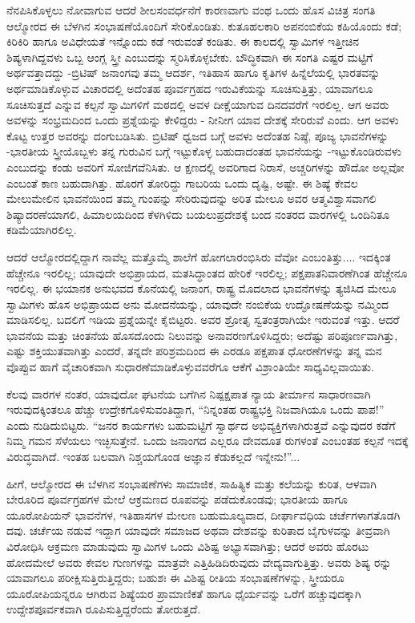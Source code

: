 ನೆನಪಿಸಿಕೊಳ್ಳಲು ನೋವಾಗುವ ಆದರೆ ಶೀಲಸಂವರ್ಧನೆಗೆ ಕಾರಣವಾಗು ವಂಥ ಒಂದು ಹೊಸ ವಿಚಿತ್ರ ಸಂಗತಿ ಆಲ್ಮೋರದ ಈ ಬೆಳಗಿನ ಸಂಭಾಷಣೆಯೊಂದಿಗೆ ಸೇರಿಕೊಂಡಿತು. ಕುತೂಹಲಕಾರಿ ಅಪನಂಬಿಕೆಯ ಕಹಿಯೊಂದು ಕಡೆ; ಕಿರಿಕಿರಿ ಹಾಗೂ ಅವಿಧೇಯತೆ ಇನ್ನೊಂದು ಕಡೆ ಇರುವಂತೆ ಕಂಡಿತು. ಈ ಕಾಲದಲ್ಲಿ ಸ್ವಾಮಿಗಳ ಇತ್ತೀಚಿನ ಶಿಷ್ಯಳಾಗಿದ್ದವಳು ಒಬ್ಬ ಆಂಗ್ಲ ಸ್ತ್ರೀ ಎಂಬುದನ್ನು ಸ್ಮರಿಸಿಕೊಳ್ಳಬೇಕು. ಬೌದ್ಧಿಕವಾಗಿ ಈ ಸಂಗತಿ ಎಷ್ಟರ ಮಟ್ಟಿಗೆ ಅರ್ಥವತ್ತಾದದ್ದು -ಬ್ರಿಟಿಷ್ ಜನಾಂಗವು ತಮ್ಮ ಆದರ್ಶ, ಇತಿಹಾಸ ಹಾಗೂ ಕೃತಿಗಳ ಹಿನ್ನೆಲೆಯಲ್ಲಿ ಭಾರತವನ್ನು ಅರ್ಥಮಾಡಿಕೊಳ್ಳುವ ವಿಚಾರದಲ್ಲಿ ಅದೆಂತಹ ಪೂರ್ವಗ್ರಹದ ಇರುವಿಕೆಯನ್ನು ಸೂಚಿಸುತ್ತಿತ್ತು, ಯಾವಾಗಲೂ ಸೂಚಿಸುತ್ತದೆ ಎನ್ನುವ ಕಲ್ಪನೆ ಸ್ವಾಮಿಗಳಿಗೆ ಮಠದಲ್ಲಿ ಅವಳ ದೀಕ್ಷೆಯಾಗುವ ದಿನದವರೆಗೆ ಇರಲಿಲ್ಲ. ಆಗ ಅವರು ಅವಳನ್ನು ಸಂಭ್ರಮದಿಂದ ಒಂದು ಪ್ರಶ್ನೆಯನ್ನು ಕೇಳಿದ್ದರು - ನೀನೀಗ ಯಾವ ದೇಶಕ್ಕೆ ಸೇರಿರುವೆ ಎಂದು. ಆಗ ಅವಳು ಕೊಟ್ಟ ಉತ್ತರ ಅವರನ್ನು ದಂಗುಬಡಿಸಿತು. ಬ್ರಿಟಿಷ್ ಧ್ವಜದ ಬಗ್ಗೆ ಅವಳು ಅದೆಂತಹ ನಿಷ್ಠೆ, ಪೂಜ್ಯ ಭಾವನೆಗಳನ್ನು -ಭಾರತೀಯ ಸ್ತ್ರೀಯೊಬ್ಬಳು ತನ್ನ ಗುರುವಿನ ಬಗ್ಗೆ ಇಟ್ಟುಕೊಳ್ಳ ಬಹುದಾದಂತಹ ಭಾವನೆಯನ್ನು -ಇಟ್ಟುಕೊಂಡಿರುವಳು ಎಂಬುದನ್ನು ಕಂಡು ಅವರಿಗೆ ಸೋಜಿಗವೆನಿಸಿತು. ಆ ಕ್ಷಣದಲ್ಲಿ ಅವರಿಗಾದ ನಿರಾಸೆ, ಅಚ್ಚರಿಗಳನ್ನು ಹೌದೋ ಅಲ್ಲವೋ ಎಂಬಂತೆ ಕಾಣ ಬಹುದಾಗಿತ್ತು. ಹೊರಗೆ ತೋರಿದ್ದು ಗಾಬರಿಯ ಒಂದು ದೃಷ್ಟಿ, ಅಷ್ಟೇ. ಈ ಶಿಷ್ಯೆ ಕೇವಲ ಮೇಲುಮೇಲಿನ ಭಾವನೆಯಿಂದ ತಮ್ಮ ಗುಂಪನ್ನು ಸೇರಿರುವುದನ್ನು ಅರಿತ ಮೇಲೂ ಅವರ ಆತ್ಮವಿಶ್ವಾಸವಾಗಲಿ ಶಿಷ್ಯಾದರಣೆಯಾಗಲಿ, ಹಿಮಾಲಯದಿಂದ ಕೆಳಗಿಳಿದು ಬಯಲುಪ್ರದೇಶಕ್ಕೆ ಬಂದ ನಂತರದ ವಾರಗಳಲ್ಲಿ ಒಂದಿನಿತೂ ಕಡಿಮೆಯಾಗಿರಲಿಲ್ಲ.

ಆದರೆ ಆಲ್ಮೋರದಲ್ಲಿದ್ದಾಗ ನಾವೆಲ್ಲ ಮತ್ತೊಮ್ಮೆ ಶಾಲೆಗೆ ಹೋಗಲಾರಂಭಿಸಿರು ವೆವೋ ಎಂಬಂತಿತ್ತು.... ಇದಕ್ಕಿಂತ ಹೆಚ್ಚೇನೂ ಇರಲಿಲ್ಲ; ಯಾವುದೇ ಅಭಿಪ್ರಾಯದ, ಮತಸಿದ್ಧಾಂತದ ಹೇರಿಕೆ ಇರಲಿಲ್ಲ; ಪಕ್ಷಪಾತನಿವಾರಣೆಗಿಂತ ಹೆಚ್ಚೇನೂ ಇರಲಿಲ್ಲ. ಈ ಭಯಾನಕ ಅನುಭವದ ಕೊನೆಯಲ್ಲಿ ಜನಾಂಗ, ರಾಷ್ಟ್ರ ಮೊದಲಾದ ಭಾವನೆಗಳನ್ನು ತ್ಯಜಿಸಿದ ಮೇಲೂ ಸ್ವಾಮಿಗಳು ಹೊಸ ಅಭಿಪ್ರಾಯದ ಅನು ಮೋದನೆಯನ್ನು, ಯಾವುದೇ ನಂಬಿಕೆಯ ಉದ್ಘೋಷಣೆಯನ್ನು ನಮ್ಮಿಂದ ಮಾಡಿಸಲಿಲ್ಲ. ಬದಲಿಗೆ ಇಡಿಯ ಪ್ರಶ್ನೆಯನ್ನೇ ಕೈಬಿಟ್ಟರು. ಅವರ ಶ್ರೋತೃ ಸ್ವತಂತ್ರರಾಗಿಯೇ ಇರುವಂತೆ ಇತ್ತು. ಆದರೆ ಭಾವನೆಯ ಮತ್ತು ಚಿಂತನೆಯ ಹೊಸದೊಂದು ನಿಲುವನ್ನು ಅನಾವರಣಗೊಳಿಸಿದ್ದರು; ಅದೆಷ್ಟು ಪರಿಪೂರ್ಣವಾಗಿತ್ತು, ಎಷ್ಟು ಶಕ್ತಿಯುತವಾಗಿತ್ತು ಎಂದರೆ, ತನ್ನದೇ ಪರಿಶ್ರಮದಿಂದ ಈ ಎರಡೂ ಪಕ್ಷಪಾತ ಧೋರಣೆಗಳನ್ನು ತನ್ನ ಮನ ವೊಪ್ಪುವ ಹಾಗೆ ವೈಚಾರಿಕವಾಗಿ ಸುಧಾರಣೆಮಾಡಿಕೊಳ್ಳುವವರೆಗೂ ಆಕೆಗೆ ವಿಶ್ರಾಂತಿಯೇ ಸಾಧ್ಯವಿಲ್ಲವಾಯಿತು.

ಕೆಲವು ವಾರಗಳ ನಂತರ, ಯಾವುದೋ ಘಟನೆಯ ಬಗೆಗಿನ ನಿಷ್ಪಕ್ಷಪಾತ ನ್ಯಾಯ ತೀರ್ಮಾನ ಸಾಧಾರಣವಾಗಿ ಇರುವುದಕ್ಕಿಂತಲೂ ಹೆಚ್ಚು ಉದ್ರೇಕಗೊಳಿಸುವಂತಿದ್ದಾಗ, “ನಿನ್ನಂತಹ ರಾಷ್ಟ್ರಭಕ್ತಿ ನಿಜವಾಗಿಯೂ ಒಂದು ಪಾಪ!” ಎಂದು ನುಡಿದುಬಿಟ್ಟರು. “ಜನರ ಕಾರ್ಯಗಳು ಬಹುಮಟ್ಟಿಗೆ ಸ್ವಾರ್ಥದ ಅಭಿವ್ಯಕ್ತಿಗಳಾಗಿರುತ್ತವೆ ಎನ್ನುವುದರ ಕಡೆಗೆ ನಿಮ್ಮ ಗಮನ ಸೆಳೆಯಲು ಇಚ್ಛಿಸುತ್ತೇನೆ. ಒಂದು ಜನಾಂಗದ ಎಲ್ಲರೂ ದೇವದೂತ ರುಗಳಂತೆ ಎಂಬಂತಹ ಕಲ್ಪನೆ ಇದಕ್ಕೆ ವಿರುದ್ಧವಾಗಿದೆ. ಇಂತಹ ಬಲವಾಗಿ ನಿಶ್ಚಯಗೊಂಡ ಅಜ್ಞಾನ ಕೆಡುಕಲ್ಲದೆ ಇನ್ನೇನು!”...

ಹೀಗೆ, ಆಲ್ಮೋರದ ಈ ಬೆಳಗಿನ ಸಂಭಾಷಣೆಗಳು ಸಾಮಾಜಿಕ, ಸಾಹಿತ್ಯಿಕ ಮತ್ತು ಕಲೆಯನ್ನು ಕುರಿತ, ಆಳವಾಗಿ ಬೇರೂರಿದ ಪೂರ್ವಗ್ರಹಗಳ ಮೇಲೆ ಆಕ್ರಮಣದ ರೂಪವನ್ನು ಪಡೆದುಕೊಂಡವು; ಭಾರತೀಯ ಹಾಗೂ ಯೂರೋಪಿಯನ್ ಭಾವನೆಗಳ, ಇತಿಹಾಸಗಳ ಮೇಲಣ ಬಹುಮೂಲ್ಯವಾದ, ದೀರ್ಘಾವಧಿಯ ಚರ್ಚೆಗಳಾಗತೊಡಗಿ ದವು. ಚರ್ಚೆಯ ನಡುವೆ ಇದ್ದಾಗ ಯಾವುದೇ ಸಮಾಜದ ಅಥವಾ ದೇಶವನ್ನು ಕುರಿತಾದ ಬೈಗುಳವನ್ನು ತೀವ್ರವಾಗಿ ವಿರೋಧಿಸಿ ಆಕ್ರಮಣ ಮಾಡುವುದು ಸ್ವಾಮಿಗಳ ಒಂದು ವಿಶಿಷ್ಟ ಅಭ್ಯಾಸವಾಗಿತ್ತು; ಆದರೆ ಅವರು ಹೊರಟು ಹೋದಮೇಲೆ ಅವರು ಕೇವಲ ಗುಣಗಳನ್ನು ಮಾತ್ರವೇ ಎತ್ತಿಹಿಡಿದಿರುವುದು ವೇದ್ಯವಾಗುತ್ತಿತ್ತು. ಅವರು ಶಿಷ್ಯ ರನ್ನು ಯಾವಾಗಲೂ ಪರೀಕ್ಷಿಸುತ್ತಿರುತ್ತಿದ್ದರು; ಬಹುಶಃ ಈ ವಿಶಿಷ್ಟ ರೀತಿಯ ಸಂಭಾಷಣೆಗಳನ್ನು, ಸ್ತ್ರೀಯರೂ ಯೂರೋಪಿಯನ್ನರೂ ಆಗಿರುವ ಶಿಷ್ಯೆಯರ ಪ್ರಾಮಾಣಿಕತೆ ಹಾಗೂ ಧೈರ್ಯವನ್ನು ಒರೆಗೆ ಹಚ್ಚುವುದಕ್ಕಾಗಿ ಉದ್ದೇಶಪೂರ್ವಕವಾಗಿ ರೂಪಿಸುತ್ತಿದ್ದರೆಂದು ತೋರುತ್ತದೆ.

